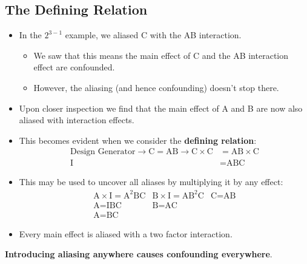 \subsection{The Defining Relation}
\begin{itemize}
    \item In the $ 2^{3-1} $ example, we aliased C with the AB interaction.
          \begin{itemize}
              \item We saw that this means the main effect of C and the AB interaction effect are confounded.
              \item However, the aliasing (and hence confounding) doesn't stop there.
          \end{itemize}
\end{itemize}
\begin{itemize}[*]
    \item Upon closer inspection we find that the main effect of A and B are now also aliased with interaction
          effects.
\end{itemize}
\begin{itemize}
    \item This becomes evident when we consider the \textbf{defining relation}:
          \begin{align*}
              \text{Design Generator}\rightarrow\text{C}=\text{AB}\rightarrow \text{C}\times\text{C} & =\text{AB}\times\text{C} \\
              \text{I}                                                                               & =\text{ABC}
          \end{align*}
    \item This may be used to uncover all aliases by multiplying it by any effect:
          \[ \begin{array}{ccc}
                  \text{A}\times\text{I}=\text{A}^2\text{BC} & \text{B}\times\text{I}=\text{A}\text{B}^2\text{C} & \text{C}=\text{AB} \\
                  \text{A}=\text{IBC}                        & \text{B}=\text{AC}                                                     \\
                  \text{A}=\text{BC}
              \end{array} \]
    \item Every main effect is aliased with a two factor interaction.
\end{itemize}
\begin{framed}
    \begin{tightcenter}
        \textbf{Introducing aliasing anywhere causes confounding everywhere}.
    \end{tightcenter}
\end{framed}
